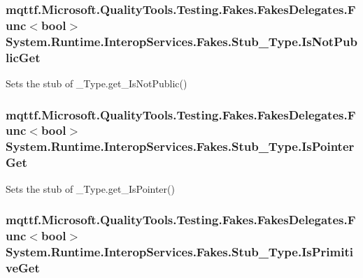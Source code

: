 \hypertarget{class_system_1_1_runtime_1_1_interop_services_1_1_fakes_1_1_stub___type_a29586df6fad59a8775bbab4bd01691d9}{
\subsubsection[{Is\-Not\-Public\-Get}]{\setlength{\rightskip}{0pt plus 5cm}mqttf.\-Microsoft.\-Quality\-Tools.\-Testing.\-Fakes.\-Fakes\-Delegates.\-Func$<$bool$>$ System.\-Runtime.\-Interop\-Services.\-Fakes.\-Stub\-\_\-\-Type.\-Is\-Not\-Public\-Get}}\label{class_system_1_1_runtime_1_1_interop_services_1_1_fakes_1_1_stub___type_a29586df6fad59a8775bbab4bd01691d9}


Sets the stub of \-\_\-\-Type.\-get\-\_\-\-Is\-Not\-Public()

\hypertarget{class_system_1_1_runtime_1_1_interop_services_1_1_fakes_1_1_stub___type_ab126b0a9db9216f62cf82bf4c0ccb3da}{
\subsubsection[{Is\-Pointer\-Get}]{\setlength{\rightskip}{0pt plus 5cm}mqttf.\-Microsoft.\-Quality\-Tools.\-Testing.\-Fakes.\-Fakes\-Delegates.\-Func$<$bool$>$ System.\-Runtime.\-Interop\-Services.\-Fakes.\-Stub\-\_\-\-Type.\-Is\-Pointer\-Get}}\label{class_system_1_1_runtime_1_1_interop_services_1_1_fakes_1_1_stub___type_ab126b0a9db9216f62cf82bf4c0ccb3da}


Sets the stub of \-\_\-\-Type.\-get\-\_\-\-Is\-Pointer()

\hypertarget{class_system_1_1_runtime_1_1_interop_services_1_1_fakes_1_1_stub___type_a42057bb8dfa9b6742aa97b471b5b64b1}{
\subsubsection[{Is\-Primitive\-Get}]{\setlength{\rightskip}{0pt plus 5cm}mqttf.\-Microsoft.\-Quality\-Tools.\-Testing.\-Fakes.\-Fakes\-Delegates.\-Func$<$bool$>$ System.\-Runtime.\-Interop\-Services.\-Fakes.\-Stub\-\_\-\-Type.\-Is\-Primitive\-Get}}\label{class_system_1_1_runtime_1_1_interop_services_1_1_fakes_1_1_stub___type_a42057bb8dfa9b6742aa97b471b5b64b1}


